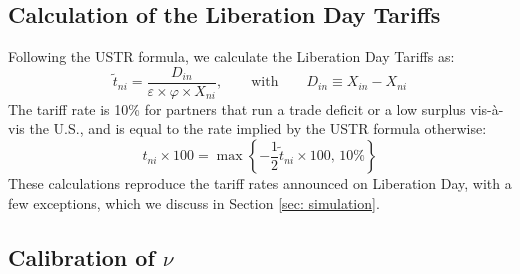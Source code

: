 \documentclass[12pt]{article}
\begin{document}
\subsection{Calculation of the Liberation Day Tariffs}\label{calculation_tariffs}
Following the USTR formula, we calculate the Liberation Day Tariffs as:
\begin{equation}
    \tilde{t}_{ni}=\frac{D_{in}}{\varepsilon\times\varphi\times X_{ni}},\qquad \text{with} \qquad D_{in}\equiv X_{in}-X_{ni}
\end{equation}
The tariff rate is 10\%  for partners that run a trade deficit or a low surplus vis-\`{a}-vis the U.S., and is equal to the rate implied by the USTR formula otherwise:
\begin{equation} \label{eq: LD} t_{ni}\times 100=\max\left\{-\frac{1}{2}\tilde{t}_{ni}\times 100,\,10\%\right\}
\end{equation}
These calculations reproduce the tariff rates announced on Liberation Day, with a few exceptions, which we discuss in Section \ref{sec: simulation}.



\subsection{Calibration of $\nu$}\label{calibration_nu}
\end{document}
